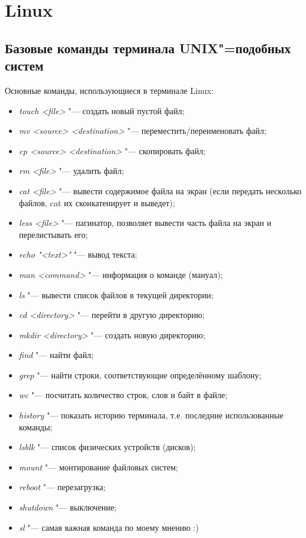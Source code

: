 \documentclass[12pt]{article}
\begin{document}
\section{Linux}

\subsection{Базовые команды терминала UNIX"=подобных систем}
Основные команды, использующиеся в терминале Linux:
\begin{itemize}
\item \textit{touch <file>} "--- создать новый пустой файл;
\item \textit{mv <source> <destination>} "--- переместить/переименовать файл;
\item \textit{cp <source> <destination>} "--- скопировать файл;
\item \textit{rm <file>} "--- удалить файл;
\item \textit{cat <file>} "--- вывести содержимое файла на экран (если передать несколько файлов, cat их сконкатенирует и выведет);
\item \textit{less <file>} "--- пагинатор, позволяет вывести часть файла на экран и перелистывать его;
\item \textit{echo "<text>"} "--- вывод текста;
\item \textit{man <command>} "--- информация о команде (мануал);
\item \textit{ls} "--- вывести список файлов в текущей директории;
\item \textit{cd <directory>} "--- перейти в другую директорию;
\item \textit{mkdir <directory>} "--- создать новую директорию;
\item \textit{find} "--- найти файл;
\item \textit{grep} "--- найти строки, соответствующие определённому шаблону;
\item \textit{wc} "--- посчитать количество строк, слов и байт в файле;
\item \textit{history} "--- показать историю терминала, т.е. последние использованные команды;
\item \textit{lsblk} "--- список физических устройств (дисков);
\item \textit{mount} "--- монтирование файловых систем;
\item \textit{reboot} "--- перезагрузка;
\item \textit{shutdown} "--- выключение;
\item \textit{sl} "--- самая важная команда по моему мнению :)
\end{itemize}
\end{document}
